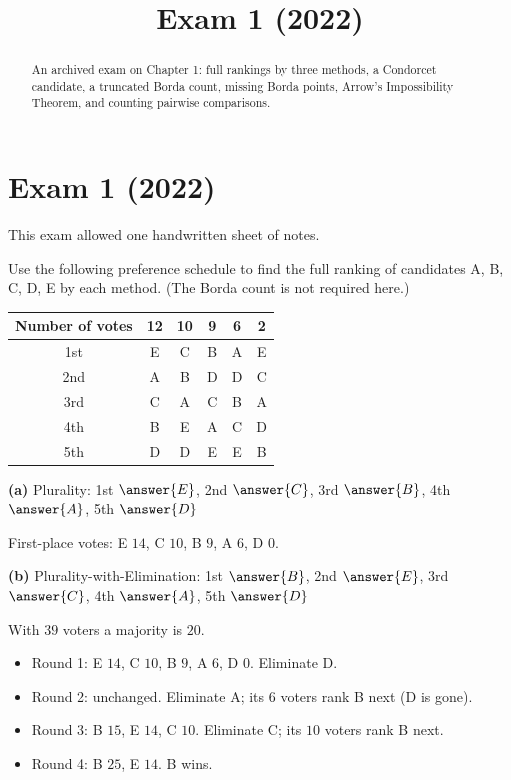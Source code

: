 \documentclass[12pt]{ximera}
\title{Exam 1 (2022)}
\begin{document}
\begin{abstract}
An archived exam on Chapter 1: full rankings by three methods, a Condorcet candidate, a truncated Borda count, missing Borda points, Arrow's Impossibility Theorem, and counting pairwise comparisons.
\end{abstract}
\maketitle

\section*{Exam 1 (2022)}

This exam allowed one handwritten sheet of notes.

\begin{problem}
Use the following preference schedule to find the full ranking of candidates A, B, C,
D, E by each method. (The Borda count is not required here.)
\begin{center}
\begin{tabular}{c|ccccc}
Number of votes & 12 & 10 & 9 & 6 & 2\\\hline
1st & E & C & B & A & E\\
2nd & A & B & D & D & C\\
3rd & C & A & C & B & A\\
4th & B & E & A & C & D\\
5th & D & D & E & E & B
\end{tabular}
\end{center}

\begin{prompt}
\textbf{(a)} Plurality: 1st $\answer{E}$, 2nd $\answer{C}$, 3rd $\answer{B}$,
4th $\answer{A}$, 5th $\answer{D}$

\begin{feedback}
First-place votes: E $14$, C $10$, B $9$, A $6$, D $0$.
\end{feedback}
\end{prompt}

\begin{prompt}
\textbf{(b)} Plurality-with-Elimination: 1st $\answer{B}$, 2nd $\answer{E}$,
3rd $\answer{C}$, 4th $\answer{A}$, 5th $\answer{D}$

\begin{feedback}
With $39$ voters a majority is $20$.
\begin{itemize}
\item Round 1: E $14$, C $10$, B $9$, A $6$, D $0$. Eliminate D.
\item Round 2: unchanged. Eliminate A; its $6$ voters rank B next (D is gone).
\item Round 3: B $15$, E $14$, C $10$. Eliminate C; its $10$ voters rank B next.
\item Round 4: B $25$, E $14$. B wins.
\end{itemize}
\end{feedback}
\end{prompt}


\end{problem}
\end{document}
